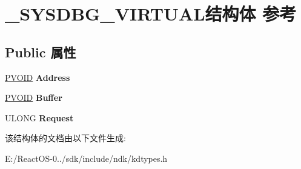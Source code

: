 \hypertarget{struct___s_y_s_d_b_g___v_i_r_t_u_a_l}{}\section{\+\_\+\+S\+Y\+S\+D\+B\+G\+\_\+\+V\+I\+R\+T\+U\+A\+L结构体 参考}
\label{struct___s_y_s_d_b_g___v_i_r_t_u_a_l}
\subsection*{Public 属性}
\begin{DoxyCompactItemize}
\item 
\mbox{\label{struct___s_y_s_d_b_g___v_i_r_t_u_a_l_aa013721fb4364e14d73258c2e0402f38}} 
\hyperlink{interfacevoid}{P\+V\+O\+ID} {\bfseries Address}
\item 
\mbox{\label{struct___s_y_s_d_b_g___v_i_r_t_u_a_l_af37a7a86dbcdd8c036e53a0a74baa474}} 
\hyperlink{interfacevoid}{P\+V\+O\+ID} {\bfseries Buffer}
\item 
\mbox{\label{struct___s_y_s_d_b_g___v_i_r_t_u_a_l_aaddab9d46c808d4c8916e4da15981f86}} 
U\+L\+O\+NG {\bfseries Request}
\end{DoxyCompactItemize}


该结构体的文档由以下文件生成\+:\begin{DoxyCompactItemize}
\item 
E\+:/\+React\+O\+S-\/0../sdk/include/ndk/kdtypes.\+h\end{DoxyCompactItemize}
